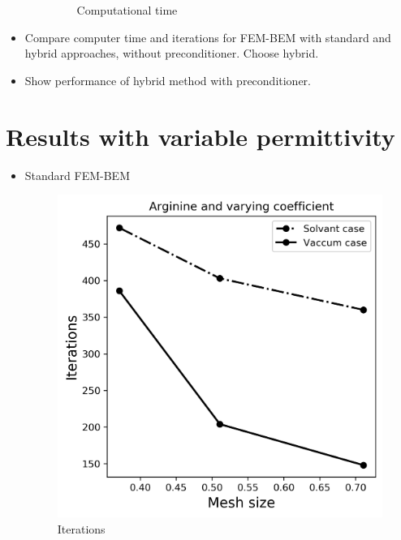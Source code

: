 \begin{itemize}
\begin{itemize}
\begin{figure}[!htb]
  \caption{Computational time}
\endminipage
\end{figure}
    \end{itemize}
    \item Compare computer time and iterations for FEM-BEM with standard and hybrid approaches, without preconditioner. Choose hybrid.
    \item Show performance of hybrid method with preconditioner.
\end{itemize}

\section*{\sffamily \Large Results with variable permittivity}

    \begin{itemize}
        \item Standard FEM-BEM
\begin{figure}[!htb]
  \includegraphics[width=\linewidth]{FEM_BEM_Sphere_varying_coeff_iter.png}
  \caption{Iterations}
\endminipage\hfill
{}%

\end{figure}
\end{itemize}
